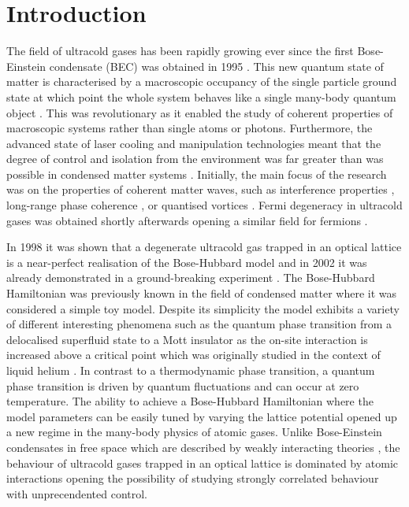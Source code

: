 
\chapter{Introduction}  %

\ifpdf
    \graphicspath{{Chapter1/Figs/Raster/}{Chapter1/Figs/PDF/}{Chapter1/Figs/}}
\else
    \graphicspath{{Chapter1/Figs/Vector/}{Chapter1/Figs/}}
\fi


The field of ultracold gases has been rapidly growing ever since the
first Bose-Einstein condensate (BEC) was obtained in 1995
\cite{anderson1995, bradley1995, davis1995}. This new quantum state of
matter is characterised by a macroscopic occupancy of the single
particle ground state at which point the whole system behaves like a
single many-body quantum object \cite{PitaevskiiStringari}. This was
revolutionary as it enabled the study of coherent properties of
macroscopic systems rather than single atoms or photons. Furthermore,
the advanced state of laser cooling and manipulation technologies
meant that the degree of control and isolation from the environment
was far greater than was possible in condensed matter systems
\cite{lewenstein2007, bloch2008}. Initially, the main focus of the
research was on the properties of coherent matter waves, such as
interference properties \cite{andrews1997}, long-range phase coherence
\cite{bloch2000}, or quantised vortices \cite{matthews1999,
  madison2000, abo2001}. Fermi degeneracy in ultracold gases was
obtained shortly afterwards opening a similar field for fermions
\cite{demarco1999, schreck2001, truscott2001}.

In 1998 it was shown that a degenerate ultracold gas trapped in an
optical lattice is a near-perfect realisation of the Bose-Hubbard
model \cite{jaksch1998} and in 2002 it was already demonstrated in a
ground-breaking experiment \cite{greiner2002}. The Bose-Hubbard
Hamiltonian was previously known in the field of condensed matter
where it was considered a simple toy model. Despite its simplicity the
model exhibits a variety of different interesting phenomena such as
the quantum phase transition from a delocalised superfluid state to a
Mott insulator as the on-site interaction is increased above a
critical point which was originally studied in the context of liquid
helium \cite{fisher1989}. In contrast to a thermodynamic phase
transition, a quantum phase transition is driven by quantum
fluctuations and can occur at zero temperature. The ability to achieve
a Bose-Hubbard Hamiltonian where the model parameters can be easily
tuned by varying the lattice potential opened up a new regime in the
many-body physics of atomic gases. Unlike Bose-Einstein condensates in
free space which are described by weakly interacting theories
\cite{dalfovo1999}, the behaviour of ultracold gases trapped in an
optical lattice is dominated by atomic interactions opening the
possibility of studying strongly correlated behaviour with
unprecendented control.


